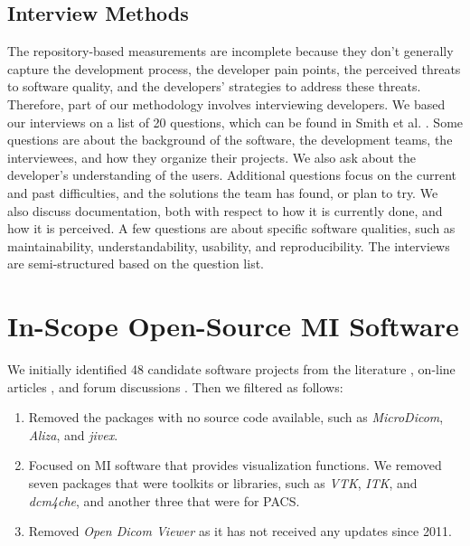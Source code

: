 \documentclass[draft, 12pt, 3p, times]{elsarticle} %
\begin{document}
\subsection{Interview Methods} \label{sec_interview_methods}

The repository-based measurements are incomplete because they don't generally
capture the development process, the developer pain points, the perceived
threats to software quality, and the developers' strategies to address these
threats.  Therefore, part of our methodology involves interviewing developers.
We based our interviews on a list of 20 questions, which can be found in Smith
et al. \cite{SmithEtAl2021}.  Some questions are about the background of the
software, the development teams, the interviewees, and how they organize their
projects.  We also ask about the developer's understanding of the users.
Additional questions focus on the current and past difficulties, and the
solutions the team has found, or plan to try. We also discuss documentation,
both with respect to how it is currently done, and how it is perceived. A few
questions are about specific software qualities, such as maintainability,
understandability, usability, and reproducibility. The interviews are
semi-structured based on the question list.

\section{In-Scope Open-Source MI Software} \label{SecWhatProjects}

We initially identified 48 candidate software projects from the literature
\cite{Bjorn2017, Bruhschwein2019, Haak2015}, on-line articles \cite{Emms2019,
Hasan2020, Mu2019}, and forum discussions \cite{Samala2014}.  Then we filtered
as follows:

\begin{enumerate}

\item Removed the packages with no source code available, such as
\textit{MicroDicom}, \textit{Aliza}, and \textit{jivex}.

\item Focused on MI software that provides visualization functions.  We removed
seven packages that were toolkits or libraries, such as \textit{VTK},
\textit{ITK}, and \textit{dcm4che}, and another three that were for PACS.

\item Removed \textit{Open Dicom Viewer} as it has not received any
updates since 2011.

\end{enumerate}
\end{document}
